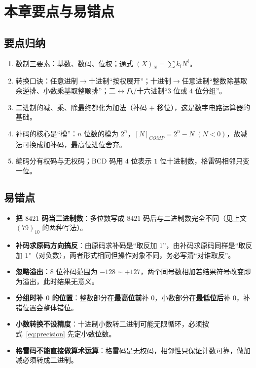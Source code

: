 \section{本章要点与易错点}
\subsection{要点归纳}
\begin{enumerate}
    \item 数制三要素：基数、数码、位权；通式 $(X)_N=\sum k_iN^{i}$。
    \item 转换口诀：任意进制$\to$十进制``按权展开''；十进制$\to$任意进制``整数除基取余逆排、小数乘基取整顺排''；二$\leftrightarrow$八/十六进制``$3$ 位或 $4$ 位分组''。
    \item 二进制的减、乘、除最终都化为加法（补码 $+$ 移位），这是数字电路运算器的基础。
    \item 补码的核心是``模''：$n$ 位数的模为 $2^{n}$，$[N]_{COMP}=2^{n}-N\;(N<0)$，故减法可换成加补码，最高位进位舍弃。
    \item 编码分有权码与无权码；BCD 码用 $4$ 位表示 $1$ 位十进制数，格雷码相邻只变一位。
\end{enumerate}

\subsection{易错点}
\begin{itemize}
    \item \textbf{把 $8421$ 码当二进制数}：多位数写成 $8421$ 码后与二进制数完全不同（见上文 $(79)_{10}$ 的两种写法）。
    \item \textbf{补码求原码方向搞反}：由原码求补码是``取反加 $1$''，由补码求原码同样是``取反加 $1$''（对负数），两者形式相同但操作对象不同，务必写清``对谁取反''。
    \item \textbf{忽略溢出}：$8$ 位补码范围为 $-128\sim+127$，两个同号数相加若结果符号改变即为溢出，此时结果无意义。
    \item \textbf{分组时补 $0$ 的位置}：整数部分在\textbf{最高位前}补 $0$，小数部分在\textbf{最低位后}补 $0$，补错位置会整体错位。
    \item \textbf{小数转换不设精度}：十进制小数转二进制可能无限循环，必须按式~\eqref{eq:precision} 先定小数位数。
    \item \textbf{格雷码不能直接做算术运算}：格雷码是无权码，相邻性只保证计数可靠，做加减必须转成二进制。
\end{itemize}
